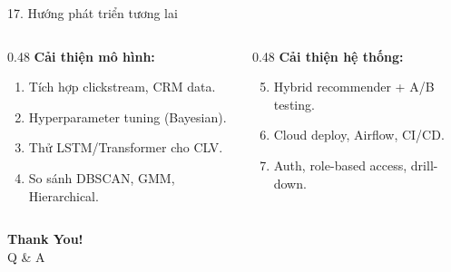 \documentclass[10pt, aspectratio=169]{beamer}
\begin{document}
\begin{frame}{17. Hướng phát triển tương lai}
    \small
    \begin{columns}[T]
        \begin{column}{0.48\textwidth}
            \textbf{Cải thiện mô hình:}
            \begin{enumerate}
                \item Tích hợp clickstream, CRM data.
                \item Hyperparameter tuning (Bayesian).
                \item Thử LSTM/Transformer cho CLV.
                \item So sánh DBSCAN, GMM, Hierarchical.
            \end{enumerate}
        \end{column}
        
        \begin{column}{0.48\textwidth}
            \textbf{Cải thiện hệ thống:}
            \begin{enumerate}
                \setcounter{enumi}{4}
                \item Hybrid recommender + A/B testing.
                \item Cloud deploy, Airflow, CI/CD.
                \item Auth, role-based access, drill-down.
            \end{enumerate}
        \end{column}
    \end{columns}
\end{frame}

\begin{frame}
    \begin{center}
        \Huge{\textbf{Thank You!}} \\
        \vspace{0.5cm}
        \Large{Q \& A}
    \end{center}
\end{frame}
\end{document}
